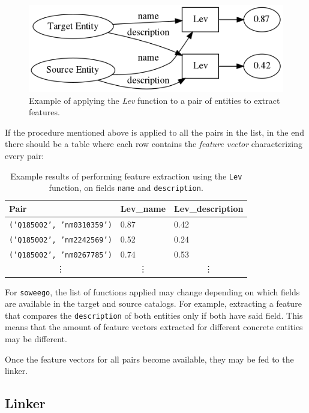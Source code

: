 \documentclass[epsfig,a4paper,11pt,titlepage,twoside,openany]{book}
\begin{document}
\begin{figure}[H]
  \centering \includegraphics[width=.6\textwidth]{feature_extraction}
  \caption{Example of applying the \textit{Lev} function to a pair of entities to extract features.}
  \label{fig:feature-extractions-flow-ex}
\end{figure}

If the procedure mentioned above is applied to all the pairs in the list, in the end there should be a table where each row contains the \textit{feature vector} characterizing every pair:

\begin{table}[H]
\centering
\begin{tabular}{l|l|l}
Pair                     & Lev\_name             & Lev\_description      \\ \hline
\texttt{('Q185002', 'nm0310359')} & 0.87                  & 0.42                  \\
\texttt{('Q185002', 'nm2242569')} & 0.52                  & 0.24                  \\
\texttt{('Q185002', 'nm0267785')} & 0.74                  & 0.53                  \\
\multicolumn{1}{c}{\vdots}    & \multicolumn{1}{c}{\vdots}  & \multicolumn{1}{c}{\vdots}  
\end{tabular}
\caption{Example results of performing feature extraction using the \texttt{Lev} function, on fields \texttt{name} and \texttt{description}.}
\label{tab:soweego-feature-extraction-example-results}
\end{table}


For \texttt{soweego}, the list of functions applied may change depending on which fields are available in the target and source catalogs. For example, extracting a feature that compares the \texttt{description} of both entities only if both have said field. This means that the amount of feature vectors extracted for different concrete entities may be different. 

Once the feature vectors for all pairs become available, they may be fed to the linker. 


\subsection{Linker}
\label{sec:soweego-st-linker}
\end{document}
